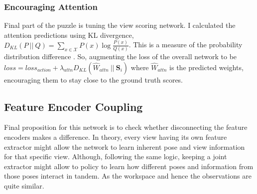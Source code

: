 \subsubsection{Encouraging Attention}
Final part of the puzzle is tuning the view scoring network. I calculated the attention predictions using KL divergence, \(D_{KL}\left(P ~||~ Q\right) = \sum_{x \in \mathcal{X}} P\left(x\right) \log \frac{P\left(x\right)}{Q\left(x\right)}\). This is a measure of the probability distribution difference . So, augmenting the loss of the overall network to be \(loss = loss_{action} + \lambda_{attn} D_{KL}\left( \hat{W}_{attn} ~||~ \mathbf{S}_i\right)\) where $\hat{W}_{attn}$ is the predicted weights, encouraging them to stay close to the ground truth scores.

\subsection{Feature Encoder Coupling}
Final proposition for this network is to check whether disconnecting the feature encoders makes a difference. In theory, every view having its own feature extractor might allow the network to learn inherent pose and view information for that specific view. Although, following the same logic, keeping a joint extractor might allow to policy to learn how different poses and information from those poses interact in tandem. As the workspace and hence the observations are quite similar.
